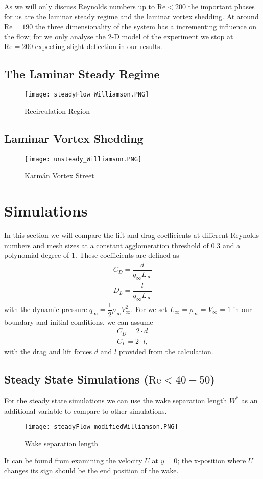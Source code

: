	As we will only discuss Reynolds numbers up to $\text{Re} < 200$ the important phases for us are the laminar steady regime and the laminar vortex shedding. At around $\text{Re} = 190$ the three dimensionality of the system has a incrementing influence on the flow; for we only analyse the 2-D model of the experiment we stop at $\text{Re} = 200$ expecting slight deflection in our results.
	
	\subsection{The Laminar Steady Regime}
	
		\begin{figure}[htp]
			\centering
			\texttt{[image: steadyFlow\_Williamson.PNG]}
			\caption{Recirculation Region }
			\label{fig:steady}
		\end{figure}
	\subsection{Laminar Vortex Shedding}
	
		\begin{figure}[htp]
			\centering
			\texttt{[image: unsteady\_Williamson.PNG]}
			\caption{Karmán Vortex Street }
			\label{fig:unsteady}
		\end{figure}
		
\section{Simulations}
	In this section we will compare the lift and drag coefficients at different Reynolds numbers and mesh sizes at a constant agglomeration threshold of $0.3$ and a polynomial degree of $1$. These coefficients are defined as
	\begin{align}
		C_D = \dfrac{d}{q_\infty L_\infty} \\
		D_L = \dfrac{l}{q_\infty L_\infty}
	\end{align}
	with the dynamic pressure $q_\infty = \dfrac{1}{2} \rho_\infty V_\infty^2$. For we set $L_\infty = \rho_\infty = V_\infty = 1$ in our boundary and initial conditions, we can assume
	\begin{align}
		C_D = 2 \cdot d \\
		C_L = 2 \cdot l,
	\end{align}
	with the drag and lift forces $d$ and $l$ provided from the calculation.
	\subsection{Steady State Simulations ($\text{Re} < 40-50$)}
	For the steady state simulations we can use the wake separation length $W^*$ as an additional variable to compare to other simulations.
			\begin{figure}[htp]
				\centering
				\texttt{[image: steadyFlow\_modifiedWilliamson.PNG]}
				\caption{Wake separation length }
				\label{fig:wakeSeparation}
			\end{figure} 
	It can be found from examining the velocity $U$ at $y=0$; the x-position where $U$ changes its sign should be the end position of the wake.

